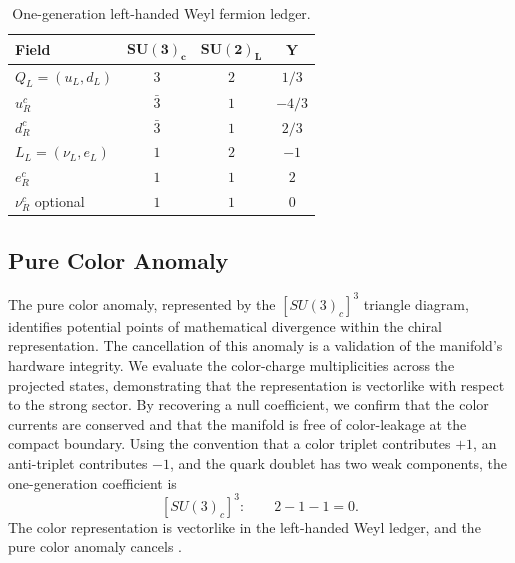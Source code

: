 \documentclass[11pt]{article}
\renewcommand{\arraystretch}{1.22}
\renewcommand{\arraystretch}{1.4}
\begin{document}
\begin{table}[ht!]
\centering
\caption{One-generation left-handed Weyl fermion ledger.}
\label{tab:pr2_one_generation_fermion_ledger}
\small
\renewcommand{\arraystretch}{1.25}
\begin{tabular}{lccc}
\hline
\textbf{Field} & \(\boldsymbol{SU(3)_c}\) & \(\boldsymbol{SU(2)_L}\) & \(\boldsymbol{Y}\) \\ \hline
\(Q_L=(u_L,d_L)\) & \(3\) & \(2\) & \(1/3\) \\
\(u_R^c\) & \(\bar 3\) & \(1\) & \(-4/3\) \\
\(d_R^c\) & \(\bar 3\) & \(1\) & \(2/3\) \\
\(L_L=(\nu_L,e_L)\) & \(1\) & \(2\) & \(-1\) \\
\(e_R^c\) & \(1\) & \(1\) & \(2\) \\
\(\nu_R^c\) optional & \(1\) & \(1\) & \(0\) \\ \hline
\end{tabular}
\end{table}

\subsection{Pure Color Anomaly}
\label{sec:pr2_pure_color_anomaly}
The pure color anomaly, represented by the $[SU(3)_c]^3$ triangle diagram, identifies potential points of mathematical divergence within the chiral representation. The cancellation of this anomaly is a validation of the manifold's hardware integrity. We evaluate the color-charge multiplicities across the projected states, demonstrating that the representation is vectorlike with respect to the strong sector. By recovering a null coefficient, we confirm that the color currents are conserved and that the manifold is free of color-leakage at the compact boundary. Using the convention that a color triplet contributes \(+1\), an anti-triplet contributes \(-1\), and the quark doublet has two weak components, the one-generation coefficient is
\begin{equation}
\boxed{
[SU(3)_c]^3:
\qquad
2-1-1=0.
}
\end{equation}
The color representation is vectorlike in the left-handed Weyl ledger, and the pure color anomaly cancels \cite{Adler1969}.
\end{document}
